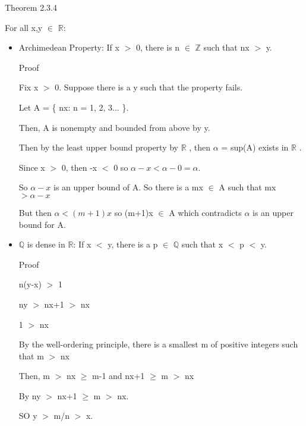 {\color{blue} Theorem 2.3.4}

For all x,y $\in$ $ \mathbb{R} $:
\begin{itemize}[leftmargin=2cm]
	\item Archimedean Property: If x $>$ 0, there is n $\in$ $ \mathbb{Z} $ such that nx $>$ y.
	
		Proof

		\qquad Fix x $>$ 0. Suppose there is a y such that the property fails.

		\qquad Let A = \{ nx: n = 1, 2, 3... \}.

		\qquad Then, A is nonempty and bounded from above by y.

		\qquad Then by the least upper bound property by $ \mathbb{R} $ , then $\alpha$ = sup(A) exists in $ \mathbb{R} $ .

		\qquad Since x $>$ 0, then -x $<$ 0 so $\alpha - x < \alpha-0 = \alpha$.

		\qquad So $\alpha-x$ is an upper bound of A. So there is a mx $\in$ A such that mx $> \alpha-x$

		\qquad But then $\alpha < (m+1)x$ so (m+1)x $\in$ A which contradicts $\alpha$ is an upper bound for A.

	\item $ \mathbb{Q} $  is dense in $ \mathbb{R} $: If x $<$ y, there is a p $\in$ $ \mathbb{Q} $
		such that x $<$ p $<$ y.

		Proof

		n(y-x) $>$ 1
		
		ny $>$ nx+1 $>$ nx
		
		1 $>$ nx

		By the well-ordering principle, there is a smallest m of positive integers such that m $>$ nx

		Then, m $>$ nx $\geq$ m-1 and nx+1 $\geq$ m $>$ nx

		By ny $>$ nx+1 $\geq$ m $>$ nx.

		SO y $>$ m/n $>$ x.

\end{itemize}




